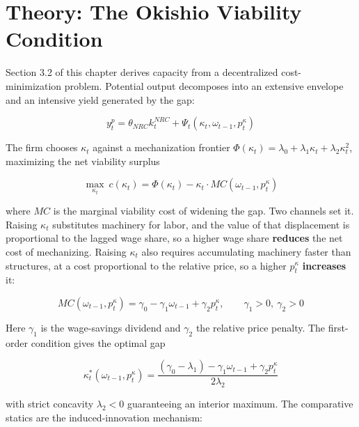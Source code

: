 \documentclass[11pt,a4paper]{article}
\begin{document}
\FloatBarrier
\section{Theory: The Okishio Viability Condition}
\label{sec:theory}

Section 3.2 of this chapter derives capacity from a decentralized cost-minimization problem. Potential output decomposes into an extensive envelope and an intensive yield generated by the gap:

\begin{equation}
y^p_t = \theta_{NRC} k^{NRC}_t + \Psi_t(\kappa_t, \omega_{t-1}, p^{\kappa}_t)
\end{equation}

The firm chooses $\kappa_t$ against a mechanization frontier $\Phi(\kappa_t) = \lambda_0 + \lambda_1 \kappa_t + \lambda_2 \kappa_t^2$, maximizing the net viability surplus

\begin{equation}
\max_{\kappa_t} \ c(\kappa_t) = \Phi(\kappa_t) - \kappa_t \cdot MC(\omega_{t-1}, p^{\kappa}_t)
\end{equation}

where $MC$ is the marginal viability cost of widening the gap. Two channels set it. Raising $\kappa_t$ substitutes machinery for labor, and the value of that displacement is proportional to the lagged wage share, so a higher wage share \textbf{reduces} the net cost of mechanizing. Raising $\kappa_t$ also requires accumulating machinery faster than structures, at a cost proportional to the relative price, so a higher $p^{\kappa}_t$ \textbf{increases} it:

\begin{equation}
MC(\omega_{t-1}, p^{\kappa}_t) = \gamma_0 - \gamma_1 \omega_{t-1} + \gamma_2 p^{\kappa}_t, \qquad \gamma_1 > 0, \ \gamma_2 > 0
\end{equation}

Here $\gamma_1$ is the wage-savings dividend and $\gamma_2$ the relative price penalty. The first-order condition gives the optimal gap

\begin{equation}
\kappa_t^{*}(\omega_{t-1}, p^{\kappa}_t) = \frac{(\gamma_0 - \lambda_1) - \gamma_1 \omega_{t-1} + \gamma_2 p^{\kappa}_t}{2\lambda_2}
\end{equation}

with strict concavity $\lambda_2 < 0$ guaranteeing an interior maximum. The comparative statics are the induced-innovation mechanism:
\end{document}
